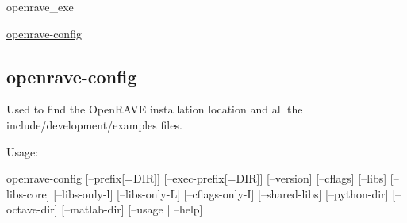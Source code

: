 
\begin{DoxyItemize}
\item openrave\_\-exe
\item \hyperlink{openrave__config}{openrave-\/config} 
\end{DoxyItemize}\hypertarget{openrave_config}{}\subsection{openrave-\/config}\label{openrave_config}
Used to find the OpenRAVE installation location and all the include/development/examples files.

Usage: \begin{DoxyVerb}
openrave-config
  [--prefix[=DIR]]
  [--exec-prefix[=DIR]]
  [--version] [--cflags]
  [--libs]
  [--libs-core]
  [--libs-only-l]
  [--libs-only-L]
  [--cflags-only-I]
  [--shared-libs]
  [--python-dir]
  [--octave-dir]
  [--matlab-dir]
  [--usage | --help]
\end{DoxyVerb}
 